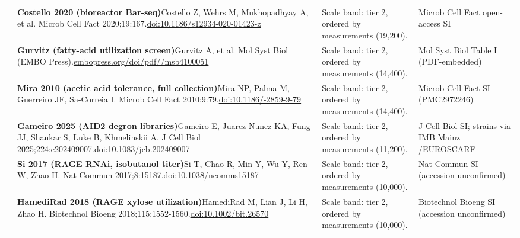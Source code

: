 \begin{landscape}
\begin{longtable}{@{}r@{\hspace{4pt}} L{86mm} L{92mm} L{62mm}@{}}
 & \textbf{Costello 2020 (bioreactor Bar-seq)}\newline Costello Z, Wehrs M, Mukhopadhyay A, et al. Microb Cell Fact 2020;19:167.\newline \href{https://doi.org/10.1186/s12934-020-01423-z}{doi:10.1186/\allowbreak s12934-020-01423-z} & Scale band: tier 2, ordered by measurements (19,200). & Microb Cell Fact open-access SI \\
 & \textbf{Gurvitz (fatty-acid utilization screen)}\newline Gurvitz A, et al. Mol Syst Biol (EMBO Press).\newline \href{https://www.embopress.org/doi/pdf/10.1038/msb4100051}{embopress.org/\allowbreak doi/\allowbreak pdf//\allowbreak msb4100051} & Scale band: tier 2, ordered by measurements (14,400). & Mol Syst Biol Table I (PDF-embedded) \\
 & \textbf{Mira 2010 (acetic acid tolerance, full collection)}\newline Mira NP, Palma M, Guerreiro JF, Sa-Correia I. Microb Cell Fact 2010;9:79.\newline \href{https://doi.org/10.1186/1475-2859-9-79}{doi:10.1186/-2859-9-79} & Scale band: tier 2, ordered by measurements (14,400). & Microb Cell Fact SI (PMC2972246) \\
 & \textbf{Gameiro 2025 (AID2 degron libraries)}\newline Gameiro E, Juarez-Nunez KA, Fung JJ, Shankar S, Luke B, Khmelinskii A. J Cell Biol 2025;224:e202409007.\newline \href{https://doi.org/10.1083/jcb.202409007}{doi:10.1083/\allowbreak jcb.202409007} & Scale band: tier 2, ordered by measurements (11,200). & J Cell Biol SI; strains via IMB Mainz /\allowbreak  EUROSCARF \\
 & \textbf{Si 2017 (RAGE RNAi, isobutanol titer)}\newline Si T, Chao R, Min Y, Wu Y, Ren W, Zhao H. Nat Commun 2017;8:15187.\newline \href{https://doi.org/10.1038/ncomms15187}{doi:10.1038/\allowbreak ncomms15187} & Scale band: tier 2, ordered by measurements (10,000). & Nat Commun SI (accession unconfirmed) \\
 & \textbf{HamediRad 2018 (RAGE xylose utilization)}\newline HamediRad M, Lian J, Li H, Zhao H. Biotechnol Bioeng 2018;115:1552-1560.\newline \href{https://doi.org/10.1002/bit.26570}{doi:10.1002/\allowbreak bit.26570} & Scale band: tier 2, ordered by measurements (10,000). & Biotechnol Bioeng SI (accession unconfirmed) \\

\end{longtable}
\end{landscape}
